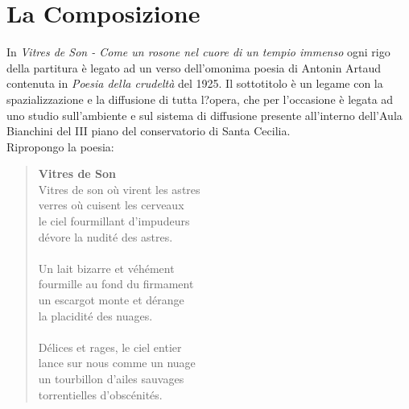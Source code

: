
\chapter{La Composizione}
\label{chp:La Composizione}
In \textit{Vitres de Son - Come un rosone nel cuore di un tempio immenso} ogni rigo della partitura è legato ad un verso dell'omonima poesia di Antonin Artaud contenuta in \textit{Poesia della crudeltà} del 1925. Il sottotitolo è un legame con la spazializzazione e la diffusione di tutta l?opera, che per l'occasione è legata ad uno studio sull'ambiente e sul sistema di diffusione presente all'interno dell'Aula Bianchini del III piano del conservatorio di Santa Cecilia. \\
Ripropongo la poesia:

\begin{quotation}
\textbf{Vitres de Son} \\
Vitres de son où virent les astres \\
verres où cuisent les cerveaux \\
le ciel fourmillant d'impudeurs \\
dévore la nudité des astres. \\ \\
Un lait bizarre et véhément \\
fourmille au fond du firmament \\
un escargot monte et dérange \\
la placidité des nuages. \\ \\
Délices et rages, le ciel entier \\
lance sur nous comme un nuage \\
un tourbillon d'ailes sauvages \\
torrentielles d'obscénités.\\
\end{quotation}

